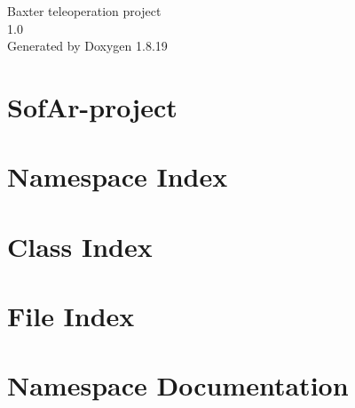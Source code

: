 \let\mypdfximage\pdfximage\def\pdfximage{\immediate\mypdfximage}\documentclass[twoside]{book}
\newcommand{\+}{\discretionary{\mbox{\scriptsize$\hookleftarrow$}}{}{}}
\newcommand{\clearemptydoublepage}{%
  \newpage{\pagestyle{empty}\cleardoublepage}%
}
\begin{document}
\hypersetup{pageanchor=false,
             bookmarksnumbered=true,
             pdfencoding=unicode
            }
\begin{titlepage}
\vspace*{7cm}
\begin{center}%
{\Large Baxter teleoperation project \\[1ex]\large 1.\+0 }\\
\vspace*{1cm}
{\large Generated by Doxygen 1.8.19}\\
\end{center}
\end{titlepage}
\clearemptydoublepage
{}
\tableofcontents
\clearemptydoublepage
{}
\hypersetup{pageanchor=true}

\chapter{Sof\+Ar-\/project}
\label{index}\hypertarget{index}{}
\chapter{Namespace Index}

\chapter{Class Index}

\chapter{File Index}

\chapter{Namespace Documentation}





















\end{document}
